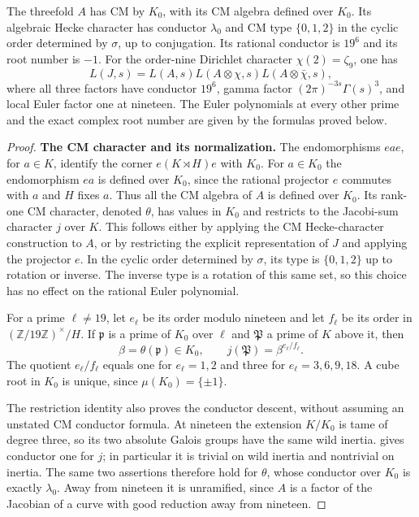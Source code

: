 \begin{proposition}\label{prop:nineteen-euler}
The threefold $A$ has CM by $K_0$, with its CM algebra defined over
$K_0$. Its algebraic Hecke character has conductor $\lambda_0$ and
CM type $\{0,1,2\}$ in the cyclic order determined by $\sigma$,
up to conjugation. Its rational conductor is $19^6$ and its root
number is $-1$. For the order-nine Dirichlet character
$\chi(2)=\zeta_9$, one has
\[
 L(J,s)=L(A,s)L(A\otimes\chi,s)L(A\otimes\bar\chi,s),
\]
where all three factors have conductor $19^6$, gamma factor
$(2\pi)^{-3s}\Gamma(s)^3$, and local Euler factor one at nineteen.
The Euler polynomials at every other prime and the exact complex
root number are given by the formulas proved below.
\end{proposition}
\begin{proof}
\par\medskip\noindent\textbf{The CM character and its normalization.} 
The endomorphisms $eae$, for $a\in K$, identify the corner
$e(K\rtimes H)e$ with $K_0$.  For $a\in K_0$ the endomorphism
$ea$ is defined over $K_0$, since the rational projector $e$
commutes with $a$ and $H$ fixes $a$.  Thus all the CM algebra
of $A$ is defined over $K_0$.  Its rank-one CM character,
denoted $\theta$, has values in $K_0$ and restricts to the
Jacobi-sum character $j$ over $K$.  This follows either by
applying the CM Hecke-character construction to $A$, or by
restricting the explicit representation of $J$ and applying
the projector $e$.  In the cyclic order determined by
$\sigma$, its type is $\{0,1,2\}$ up to rotation or inverse.
The inverse type is a rotation of this same set, so this
choice has no effect on the rational Euler polynomial.

For a prime $\ell\ne19$, let $e_\ell$ be its order modulo
nineteen and let $f_\ell$ be its order in
$(\mathbb Z/19\mathbb Z)^\times/H$.  If $\mathfrak p$ is a
prime of $K_0$ over $\ell$ and $\mathfrak P$ a prime of $K$
above it, then
\[
 \beta=\theta(\mathfrak p)\in K_0,\qquad
 j(\mathfrak P)=\beta^{e_\ell/f_\ell}.
\]
The quotient $e_\ell/f_\ell$ equals one for $e_\ell=1,2$
and three for $e_\ell=3,6,9,18$.  A cube root in $K_0$ is
unique, since $\mu(K_0)=\{\pm1\}$.

The restriction identity also proves the conductor descent,
without assuming an unstated CM conductor formula.  At
nineteen the extension $K/K_0$ is tame of degree three,
so its two absolute Galois groups have the same wild
inertia.  \citet[Proposition~3.12(1), author p.~16]{ShuExpanded2021}
gives conductor one for $j$; in particular it is trivial
on wild inertia and nontrivial on inertia.  The same two
assertions therefore hold for $\theta$, whose conductor
over $K_0$ is exactly $\lambda_0$.  Away from nineteen it
is unramified, since $A$ is a factor of the Jacobian of
a curve with good reduction away from nineteen.


\end{proof}

